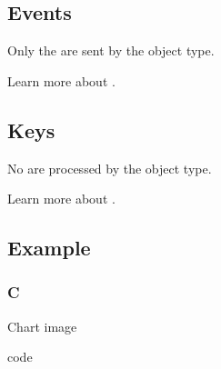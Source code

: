 \documentclass[letterpaper,10pt,english]{sphinxmanual}
\begin{document}
\subsection{Events}
\label{\detokenize{object-types/chart:events}}
Only the  are sent by the object type.

Learn more about {\hyperref[\detokenize{overview/events::doc}]{}}.


\subsection{Keys}
\label{\detokenize{object-types/chart:keys}}
No  are processed by the object type.

Learn more about {\hyperref[\detokenize{overview/indev::doc}]{}}.


\subsection{Example}
\label{\detokenize{object-types/chart:example}}

\subsubsection{C}
\label{\detokenize{object-types/chart:c}}
Chart image

code
\end{document}
